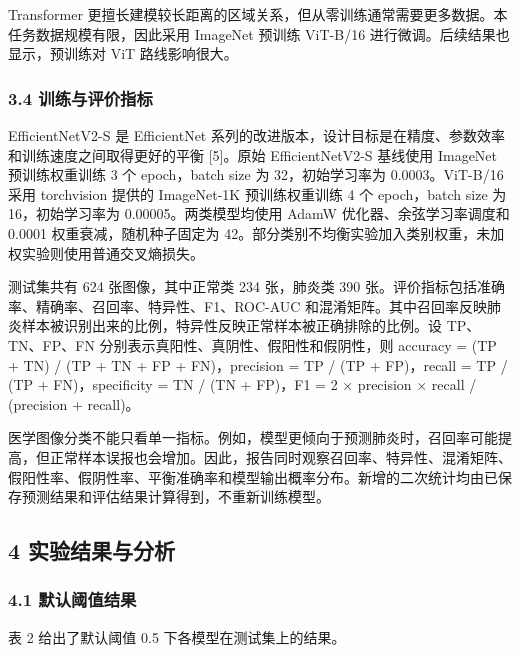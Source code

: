\documentclass[
]{ctexart}
\begin{document}
Transformer
更擅长建模较长距离的区域关系，但从零训练通常需要更多数据。本任务数据规模有限，因此采用
ImageNet 预训练 ViT-B/16 进行微调。后续结果也显示，预训练对 ViT
路线影响很大。

\hypertarget{ux8badux7ec3ux4e0eux8bc4ux4ef7ux6307ux6807}{%
\subsubsection{3.4
训练与评价指标}\label{ux8badux7ec3ux4e0eux8bc4ux4ef7ux6307ux6807}}

EfficientNetV2-S 是 EfficientNet
系列的改进版本，设计目标是在精度、参数效率和训练速度之间取得更好的平衡
{[}5{]}。原始 EfficientNetV2-S 基线使用 ImageNet 预训练权重训练 3 个
epoch，batch size 为 32，初始学习率为 0.0003。ViT-B/16 采用 torchvision
提供的 ImageNet-1K 预训练权重训练 4 个 epoch，batch size 为
16，初始学习率为 0.00005。两类模型均使用 AdamW 优化器、余弦学习率调度和
0.0001 权重衰减，随机种子固定为
42。部分类别不均衡实验加入类别权重，未加权实验则使用普通交叉熵损失。

测试集共有 624 张图像，其中正常类 234 张，肺炎类 390
张。评价指标包括准确率、精确率、召回率、特异性、F1、ROC-AUC
和混淆矩阵。其中召回率反映肺炎样本被识别出来的比例，特异性反映正常样本被正确排除的比例。设
TP、TN、FP、FN 分别表示真阳性、真阴性、假阳性和假阴性，则 accuracy = (TP
+ TN) / (TP + TN + FP + FN)，precision = TP / (TP + FP)，recall = TP /
(TP + FN)，specificity = TN / (TN + FP)，F1 = 2 × precision × recall /
(precision + recall)。

医学图像分类不能只看单一指标。例如，模型更倾向于预测肺炎时，召回率可能提高，但正常样本误报也会增加。因此，报告同时观察召回率、特异性、混淆矩阵、假阳性率、假阴性率、平衡准确率和模型输出概率分布。新增的二次统计均由已保存预测结果和评估结果计算得到，不重新训练模型。

\hypertarget{ux5b9eux9a8cux7ed3ux679cux4e0eux5206ux6790}{%
\subsection{4
实验结果与分析}\label{ux5b9eux9a8cux7ed3ux679cux4e0eux5206ux6790}}

\hypertarget{ux9ed8ux8ba4ux9608ux503cux7ed3ux679c}{%
\subsubsection{4.1
默认阈值结果}\label{ux9ed8ux8ba4ux9608ux503cux7ed3ux679c}}

表 2 给出了默认阈值 0.5 下各模型在测试集上的结果。
\end{document}
